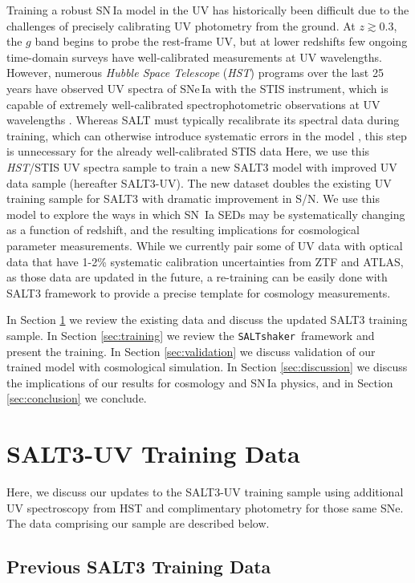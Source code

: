 \documentclass[twocolumn,tighten,times,floatfix]{aastex631}
\newcommand{\saltshaker}{\texttt{SALTshaker}}
\begin{document}
Training a robust SN\,Ia model in the UV has historically been difficult due to the challenges of precisely calibrating UV photometry from the ground.  At $z \gtrsim 0.3$, the $g$ band begins to probe the rest-frame UV, but at lower redshifts few ongoing time-domain surveys have well-calibrated measurements at UV wavelengths. However, numerous {\it Hubble Space Telescope} ({\it HST}) programs over the last 25 years have observed UV spectra of SNe\,Ia with the STIS instrument, which is capable of extremely well-calibrated spectrophotometric observations at UV wavelengths \citep{Bohlin20, Bohlin20b}.
Whereas SALT must typically recalibrate its spectral data during training, which can otherwise introduce systematic errors in the model \citep{Dai23}, this step is unnecessary for the already well-calibrated STIS data
Here, we use this \textit{HST}/STIS UV spectra sample to train a new SALT3 model with improved UV data sample (hereafter SALT3-UV).  The new dataset doubles the existing UV training sample for SALT3 with dramatic improvement in S/N.  We use this model to explore the ways in which SN~Ia SEDs may be systematically changing as a function of redshift, and the resulting implications for cosmological parameter measurements.
While we currently pair some of UV data with optical data that have 1-2\% systematic calibration uncertainties from ZTF and ATLAS, as those data are updated in the future, a re-training can be easily done with SALT3 framework to provide a precise template for cosmology measurements. 

In Section \ref{sec:data} we review the existing data and discuss the updated SALT3 training sample.  In Section \ref{sec:training} we review the \saltshaker\ framework and present the training. In Section \ref{sec:validation} we discuss validation of our trained model with cosmological simulation. In Section \ref{sec:discussion} we discuss the implications of our results for cosmology and SN\,Ia physics, and in Section \ref{sec:conclusion} we conclude.


\section{SALT3-UV Training Data} \label{sec:data}

Here, we discuss our updates to the SALT3-UV training sample using additional UV spectroscopy from HST and complimentary photometry for those same SNe.  The data comprising our sample are described below.

\subsection{Previous SALT3 Training Data}
\end{document}
